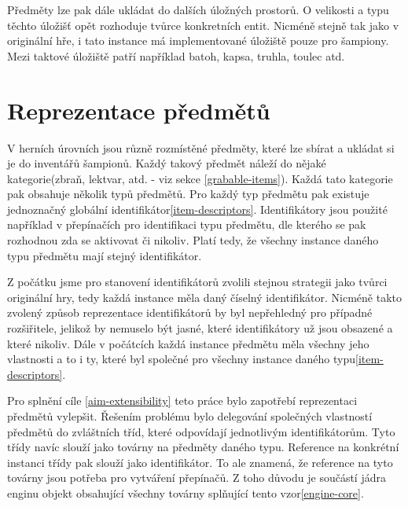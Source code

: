Předměty lze pak dále ukládat do dalších úložných prostorů.  O velikosti a typu těchto úložišť opět rozhoduje tvůrce konkretních 
entit. Nicméně stejně tak jako v originální hře, i tato instance má implementované 
úložiště pouze pro šampiony. Mezi taktové úložiště patří například batoh, kapsa, truhla, toulec atd.

\section{Reprezentace předmětů}

V herních úrovních jsou různě rozmístěné předměty, které lze sbírat a ukládat si je do inventářů šampionů.
Každý takový předmět náleží do nějaké kategorie(zbraň, lektvar, atd. - viz sekce \ref{grabable-items}). Každá
tato kategorie pak obsahuje několik typů předmětů. Pro každý typ předmětu pak existuje jednoznačný globální identifikátor\vref{item-descriptors}.
Identifikátory jsou použité například v přepínačích pro identifikaci typu předmětu, dle kterého se pak rozhodnou zda se aktivovat či nikoliv.
Platí tedy, že všechny instance daného typu předmětu mají stejný identifikátor.

Z počátku jsme pro stanovení identifikátorů zvolili stejnou strategii jako tvůrci originální hry, tedy každá
instance měla daný číselný identifikátor.
Nicméně takto zvolený způsob reprezentace identifikátorů by byl nepřehledný pro případné rozšiřitele, jelikož
by nemuselo být jasné, které identifikátory už jsou obsazené a které nikoliv. Dále v počátcích každá instance
předmětu měla všechny jeho vlastnosti a to i ty, které byl společné pro všechny instance daného typu\vref{item-descriptors}.

Pro splnění cíle \ref{aim-extensibility} teto práce bylo zapotřebí reprezentaci předmětů vylepšit.
Řešením problému bylo delegování společných vlastností předmětů do zvláštních tříd, které odpovídají jednotlivým identifikátorům.
Tyto třídy navíc slouží jako továrny na předměty daného typu. Reference na konkrétní instanci třídy pak slouží jako identifikátor.
To ale znamená, že reference na tyto továrny jsou potřeba pro vytváření přepínačů. Z toho důvodu je součástí jádra enginu
objekt obsahující všechny továrny splňující tento vzor\vref{engine-core}.

